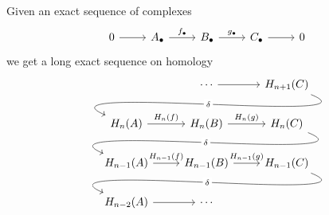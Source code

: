\documentclass[main.tex]{subfiles}
\begin{document}
\begin{corollary}
  \label{cor:long_exact_sequence_on_homology}
  Given an exact sequence of complexes
  \begin{equation*}
    \begin{tikzcd}
      0
      \arrow[r]
      & A_{\bullet}
      \arrow[r, "f_{\bullet}"]
      & B_{\bullet}
      \arrow[r, "g_{\bullet}"]
      & C_{\bullet}
      \arrow[r]
      & 0
    \end{tikzcd}
  \end{equation*}
  we get a long exact sequence on homology
  \begin{equation*}
    \begin{tikzcd}
      & \cdots
      \arrow[r]
      & H_{n+1}(C)
      \\
      H_{n}(A)
      \arrow[from=urr, out=-22, in=157, looseness=1, overlay, "\delta" description]
      \arrow[r, "H_{n}(f)"]
      & H_{n}(B)
      \arrow[r, "H_{n}(g)"]
      & H_{n}(C)
      \\
      H_{n-1}(A)
      \arrow[from=urr, out=-22, in=157, looseness=1, overlay, "\delta" description]
      \arrow[r, "H_{n-1}(f)"]
      & H_{n-1}(B)
      \arrow[r, "H_{n-1}(g)"]
      & H_{n-1}(C)
      \\
      H_{n-2}(A)
      \arrow[from=urr, out=-22, in=157, looseness=1, overlay, "\delta" description]
      \arrow[r]
      & \cdots
    \end{tikzcd}
  \end{equation*}
\end{corollary}
\end{document}
